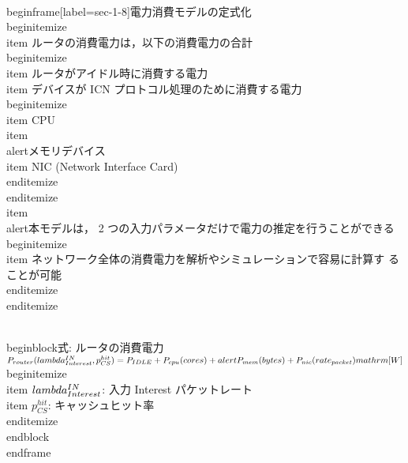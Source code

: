{\\begin{frame}[label=sec-1-8]{電力消費モデルの定式化}
\\begin{itemize}
\\item ルータの消費電力は，以下の消費電力の合計
\\begin{itemize}
\\item ルータがアイドル時に消費する電力
\\item デバイスが ICN プロトコル処理のために消費する電力
\\begin{itemize}
\\item CPU
\\item \\alert{メモリデバイス}
\\item NIC (Network Interface Card)
\\end{itemize}
\\end{itemize}
\\item \\alert{本モデルは， 2 つの入力パラメータだけで電力の推定を行うことができる}
\\begin{itemize}
\\item ネットワーク全体の消費電力を解析やシミュレーションで容易に計算す
ることが可能
\\end{itemize}
\\end{itemize}

\\begin{block}{式: ルータの消費電力}%
$P_{router}(\\lambda^{IN}_{Interest}, p^{hit}_{CS}) = P_{IDLE} +
P_{cpu}(cores) + \\alert{P_{mem}(bytes)} + P_{nic}(rate_{packet}) \\mathrm{[W]}$
\\begin{itemize}
\\item $\\lambda^{IN}_{Interest}$: 入力 Interest パケットレート
\\item $p^{hit}_{CS}$: キャッシュヒット率
\\end{itemize}
\\end{block}
\\end{frame}

}
